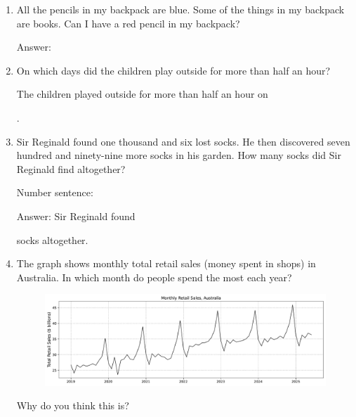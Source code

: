 \documentclass{tufte-book}
\begin{document}
\begin{enumerate}

\item All the pencils in my backpack are blue. Some of the things in my backpack are books. Can I have a red pencil in my backpack?\medskip\par
Answer: \dotfill\medskip

\item {}
On which days did the children play outside for more than half an hour?\bigskip\par
The children played outside for more than half an hour on \dotfill\bigskip\par\dotfill\bigskip.

\item Sir Reginald found one thousand and six lost socks. He then discovered seven hundred and ninety-nine more socks in his garden. 
How many socks did Sir Reginald find altogether?\medskip\par
Number sentence: \dotfill\medskip\par
Answer: Sir Reginald found 
\dotfill\medskip\par\mbox{}\dotfill\medskip\par\mbox{}\dotfill\bigskip
 socks altogether.

\item The graph shows monthly total retail sales (money spent in shops) in Australia.
In which month do people spend the most each year?\bigskip\par
\dotfill\bigskip\par
\begin{figure}[h]\includegraphics[width=1.3\textwidth]{fig/line_retail_sales.pdf}\end{figure}
Why do you think this is?
\dotfill\bigskip\par
\dotfill\bigskip\par

\end{enumerate}
\end{document}
